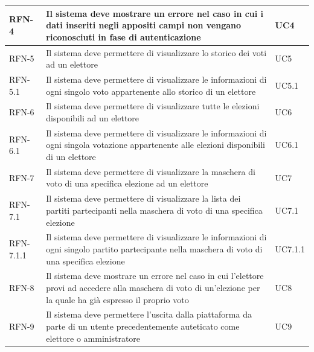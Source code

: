 \begin{longtable}{| p{} | p{} | p{} |}
RFN-4     & Il sistema deve mostrare un errore nel caso in cui i dati inseriti negli appositi campi non vengano riconosciuti in fase di autenticazione & UC4 \\

\hline

RFN-5     & Il sistema deve permettere di visualizzare lo storico dei voti ad un elettore & UC5 \\

\hline

RFN-5.1     & Il sistema deve permettere di visualizzare le informazioni di ogni singolo voto appartenente allo storico di un elettore & UC5.1 \\

\hline

RFN-6     & Il sistema deve permettere di visualizzare tutte le elezioni disponibili ad un elettore & UC6 \\

\hline

RFN-6.1     & Il sistema deve permettere di visualizzare le informazioni di ogni singola votazione appartenente alle elezioni disponibili di un elettore & UC6.1 \\

\hline

RFN-7     & Il sistema deve permettere di visualizzare la maschera di voto di una specifica elezione ad un elettore & UC7 \\

\hline

RFN-7.1     & Il sistema deve permettere di visualizzare la lista dei partiti partecipanti nella maschera di voto di una specifica elezione & UC7.1 \\

\hline

RFN-7.1.1     & Il sistema deve permettere di visualizzare le informazioni di ogni singolo partito partecipante nella maschera di voto di una specifica elezione & UC7.1.1 \\

\hline

RFN-8     & Il sistema deve mostrare un errore nel caso in cui l'elettore provi ad accedere alla maschera di voto di un'elezione per la quale ha già espresso il proprio voto & UC8 \\

\hline

RFN-9     & Il sistema deve permettere l'uscita dalla piattaforma da parte di un utente precedentemente auteticato come elettore o amministratore & UC9 \\


\end{longtable}
